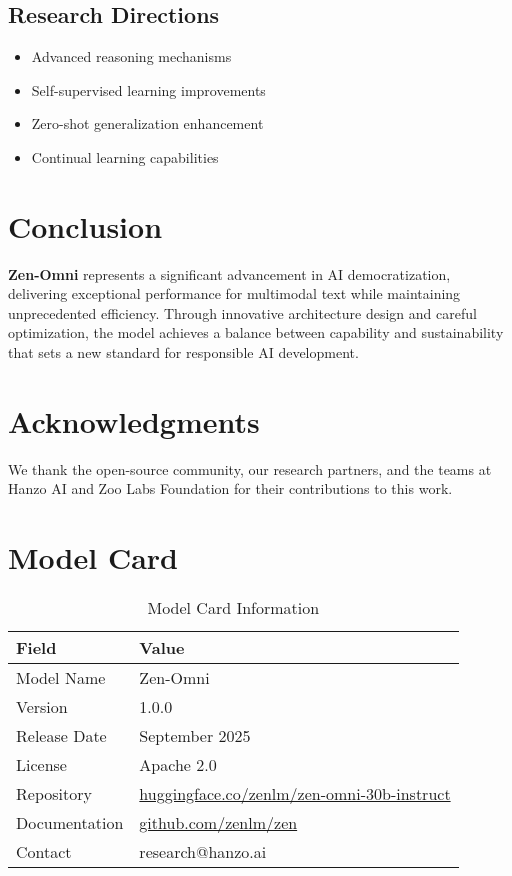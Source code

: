 \documentclass[11pt,a4paper]{article}
\begin{document}
\subsection{Research Directions}
\begin{itemize}
    \item Advanced reasoning mechanisms
    \item Self-supervised learning improvements
    \item Zero-shot generalization enhancement
    \item Continual learning capabilities
\end{itemize}

\section{Conclusion}

\textbf{Zen-Omni} represents a significant advancement in AI democratization, 
delivering exceptional performance for multimodal text while maintaining 
unprecedented efficiency. Through innovative architecture design and careful optimization, 
the model achieves a balance between capability and sustainability that sets a new standard 
for responsible AI development.

\section*{Acknowledgments}

We thank the open-source community, our research partners, and the teams at Hanzo AI and 
Zoo Labs Foundation for their contributions to this work.




\appendix

\section{Model Card}

\begin{table}[H]
\centering
\begin{tabular}{ll}
\toprule
\textbf{Field} & \textbf{Value} \\
\midrule
Model Name & Zen-Omni \\
Version & 1.0.0 \\
Release Date & September 2025 \\
License & Apache 2.0 \\
Repository & \href{https://huggingface.co/zenlm/zen-omni-30b-instruct}{huggingface.co/zenlm/zen-omni-30b-instruct} \\
Documentation & \href{https://github.com/zenlm/zen}{github.com/zenlm/zen} \\
Contact & research@hanzo.ai \\
\bottomrule
\end{tabular}
\caption{Model Card Information}
\end{table}
\end{document}
